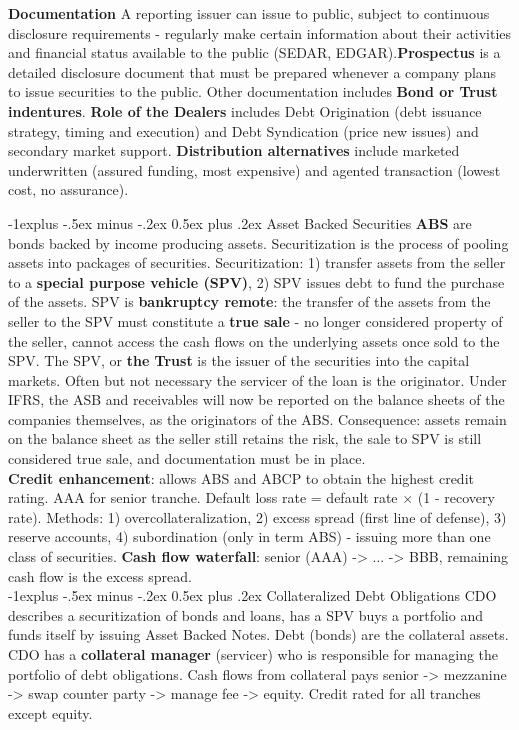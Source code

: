 \documentclass[10pt,landscape]{article}
\makeatletter
\renewcommand{\subsection}{\@startsection{subsection}{2}{0mm}%
                                {-1explus -.5ex minus -.2ex}%
                                {0.5ex plus .2ex}%
                                {\normalfont\normalsize\bfseries}}
\makeatother
\begin{document}
\begin{multicols}{3}
{\bf Documentation} A reporting issuer can issue to public, subject to continuous disclosure requirements - regularly make certain information about their activities and financial status available to the public (SEDAR, EDGAR).{\bf Prospectus} is a detailed disclosure document that must be prepared whenever a company plans to issue securities to the public. Other documentation includes {\bf Bond or Trust indentures}. {\bf Role of the Dealers} includes Debt Origination (debt issuance strategy, timing and execution) and Debt Syndication (price new issues) and secondary market support. {\bf Distribution alternatives} include marketed underwritten (assured funding, most expensive) and agented transaction (lowest cost, no assurance).

\subsection{Asset Backed Securities}
{\bf ABS} are bonds backed by income producing assets. Securitization is the process of pooling assets into packages of securities. Securitization: 1) transfer assets from the seller to a {\bf special purpose vehicle (SPV)}, 2) SPV issues debt to fund the purchase of the assets. SPV is {\bf bankruptcy remote}: the transfer of the assets from the seller to the SPV must constitute a {\bf true sale} - no longer considered property of the seller, cannot access the cash flows on the underlying assets once sold to the SPV. The SPV, or {\bf the Trust} is the issuer of the securities into the capital markets. Often but not necessary the servicer of the loan is the originator. Under IFRS, the ASB and receivables will now be reported on the balance sheets of the companies themselves, as the originators of the ABS. Consequence: assets remain on the balance sheet as the seller still retains the risk, the sale to SPV is still considered true sale, and documentation must be in place.\\
{\bf Credit enhancement}: allows ABS and ABCP to obtain the highest credit rating. AAA for senior tranche. Default loss rate = default rate $\times$ (1 - recovery rate). Methods: 1) overcollateralization, 2) excess spread (first line of defense), 3) reserve accounts, 4) subordination (only in term ABS) - issuing more than one class of securities. {\bf Cash flow waterfall}: senior (AAA) -> ... -> BBB, remaining cash flow is the excess spread.\\

\subsection{Collateralized Debt Obligations}
CDO describes a securitization of bonds and loans, has a SPV buys a portfolio and funds itself by issuing Asset Backed Notes. Debt (bonds) are the collateral assets. CDO has a {\bf collateral manager} (servicer) who is responsible for managing the portfolio of debt obligations. Cash flows from collateral pays senior -> mezzanine -> swap counter party -> manage fee -> equity. Credit rated for all tranches except equity.


\end{multicols}
\end{document}
